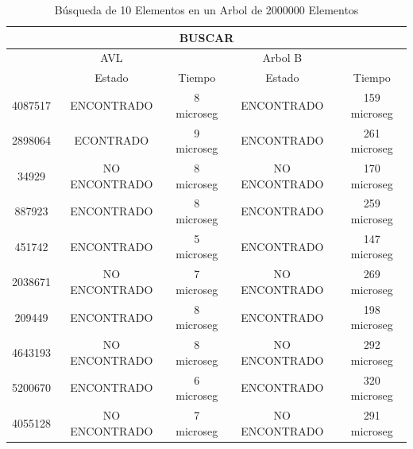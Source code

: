 \documentclass[acmsmall]{acmart}
\begin{document}
\begin{table}[htbp]
\begin{center}
  \caption{Búsqueda de 10 Elementos en un Arbol de 2000000 Elementos}
  \begin{tabular}{ccccc}
    \toprule
    \multicolumn{5}{c}{BUSCAR}\\
    \midrule
     \, & AVL &\, & Arbol B & \,\\
     \, &Estado&Tiempo&Estado&Tiempo \\
     
4087517&ENCONTRADO&8 microseg&ENCONTRADO&159 microseg\\

2898064&ECONTRADO&9 microseg&ENCONTRADO&261 microseg\\

34929&NO ENCONTRADO&8 microseg&NO ENCONTRADO&170 microseg\\

887923&ENCONTRADO&8 microseg&ENCONTRADO&259 microseg\\

451742&ENCONTRADO&5 microseg&ENCONTRADO&147 microseg\\

2038671&NO ENCONTRADO&7 microseg&NO ENCONTRADO&269 microseg\\

209449&ENCONTRADO&8 microseg&ENCONTRADO&198 microseg\\

4643193&NO ENCONTRADO&8 microseg&NO ENCONTRADO&292 microseg\\

5200670&ENCONTRADO&6 microseg&ENCONTRADO&320 microseg\\

4055128&NO ENCONTRADO&7 microseg&NO ENCONTRADO&291 microseg\\

    \bottomrule
  \end{tabular}
  \end{center}
\end{table}
\end{document}
